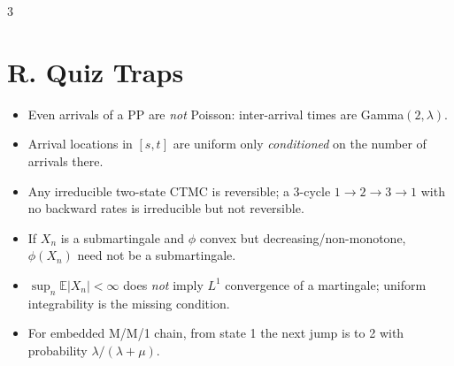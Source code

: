 \documentclass[8pt]{extarticle}
\newcommand{\E}{\mathbb{E}}
\newcommand{\1}{\mathbf{1}}
\begin{document}
\begin{multicols*}{3}
\section*{R. Quiz Traps}
\begin{itemize}
\item Even arrivals of a PP are \emph{not} Poisson: inter-arrival times are Gamma$(2,\lambda)$.
\item Arrival locations in $[s,t]$ are uniform only \emph{conditioned} on the number of arrivals there.
\item Any irreducible two-state CTMC is reversible; a 3-cycle $1\to2\to3\to1$ with no backward rates is irreducible but not reversible.
\item If $X_n$ is a submartingale and $\phi$ convex but decreasing/non-monotone, $\phi(X_n)$ need not be a submartingale.
\item $\sup_n\E|X_n|<\infty$ does \emph{not} imply $L^1$ convergence of a martingale; uniform integrability is the missing condition.
\item For embedded M/M/1 chain, from state 1 the next jump is to 2 with probability $\lambda/(\lambda+\mu)$.
\end{itemize}

\end{multicols*}
\end{document}
